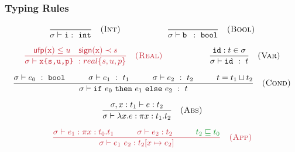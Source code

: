 \documentclass[handout,t]{beamer}
\def\real#1{real\{#1\}}
\def\Gamma{\sigma}
\def\Pi{\pi}
\begin{document}
\begin{frame}
\frametitle{Typing Rules}

\small


$$
\frac{}
     {\Gamma \vdash \texttt{i} :\ \mathtt{int} }\quad\textsc{(Int)}
	 \hspace{2cm}
\frac{}
     {\Gamma \vdash \texttt{b } :\ \mathtt{bool} }\quad\textsc{(Bool)}
$$

$$\color{red}
     \frac{\mathsf{ufp}(\texttt{x})\le u\quad \mathsf{sign}(\texttt{x})\prec s
     }
     {\Gamma \vdash \texttt{x\{s,u,p\}}\ :\real{s,u,p} }\quad\textsc{(Real)}
\hspace{2cm}\color{black}
\frac{\mathtt{id} : t \in \Gamma}
     {\Gamma \vdash \mathtt{id}\ :\ t }\quad\textsc{(Var)}
$$

$$
\frac{
\Gamma \vdash e_0\ :\ \mathtt{bool}\hspace{1cm}\Gamma \vdash e_1\ :\ t_1\hspace{1cm} \Gamma \vdash e_2\ :\ t_2
\hspace{1cm} t=t_1\sqcup t_2}
{\Gamma\vdash \mathtt{if}\ e_0\ \mathtt{then}\ e_1\ \mathtt{else}\ e_2\ :\  t}\quad\textsc{(Cond)}
$$

$$
\frac{\Gamma,x :t_1 \vdash e :  t_2}
     {\Gamma \vdash \lambda x.e : \Pi x:t_1 .  t_2}\quad\textsc{(Abs)}
$$

$$\color{red}
\frac{\Gamma \vdash e_1 : \Pi x: t_0. t_1\hspace{1cm} \Gamma \vdash e_2 :  t_2
\hspace{1cm} \textcolor{green}{t_2\sqsubseteq t_0}
}
     {\Gamma \vdash e_1\ e_2 :  t_2[x\mapsto e_2]}\quad\textsc{(App)}
$$


\end{frame}
\end{document}
